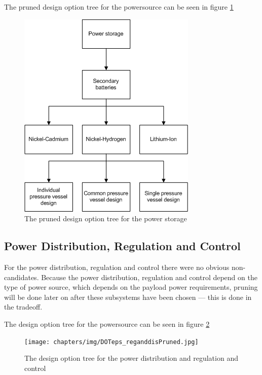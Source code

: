 The pruned design option tree for the powersource can be seen in figure \ref{fig:DOTeps_storagePruned}

\begin{figure}
\includegraphics{chapters/img/DOTeps_storagePruned.png}
\caption{The pruned design option tree for the power storage}
\label{fig:DOTeps_storagePruned}
\end{figure}

\subsection{Power Distribution, Regulation and Control}
\label{pruneEPS:Distribution}
For the power distribution, regulation and control there were no obvious non-candidates. Because the power distribution, regulation and control depend on the type of power source, which depends on the payload power requirements, pruning will be done later on after these subsystems have been chosen --- this is done in the tradeoff.

The design option tree for the powersource can be seen in figure \ref{fig:DOTeps_reganddisPruned}

\begin{figure}
\texttt{[image: chapters/img/DOTeps\_reganddisPruned.jpg]}
\caption{The design option tree for the power distribution and regulation and control}
\label{fig:DOTeps_reganddisPruned}
\end{figure}